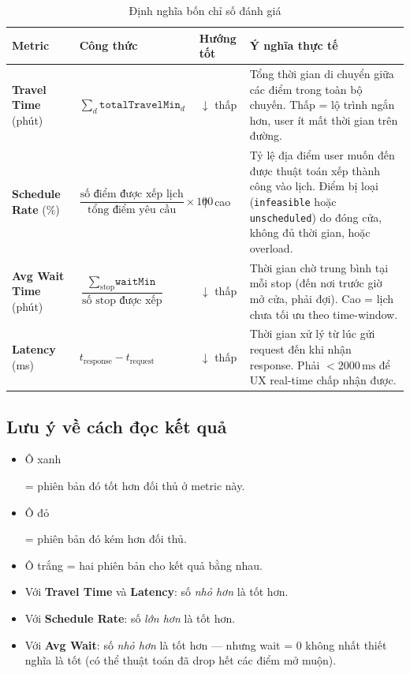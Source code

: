 \documentclass[12pt,a4paper]{article}
\begin{document}
\begin{table}[H]
\centering
\begin{tabular}{lp{4.5cm}lp{5.5cm}}
\toprule
\textbf{Metric} & \textbf{Công thức} & \textbf{Hướng tốt} & \textbf{Ý nghĩa thực tế} \\
\midrule
\textbf{Travel Time} (phút)
  & $\sum_{d} \texttt{totalTravelMin}_d$
  & $\downarrow$ thấp
  & Tổng thời gian di chuyển giữa các điểm trong toàn bộ chuyến. Thấp = lộ trình ngắn hơn, user ít mất thời gian trên đường. \\[6pt]
\textbf{Schedule Rate} (\%)
  & $\dfrac{\text{số điểm được xếp lịch}}{\text{tổng điểm yêu cầu}} \times 100$
  & $\uparrow$ cao
  & Tỷ lệ địa điểm user muốn đến được thuật toán xếp thành công vào lịch. Điểm bị loại (\texttt{infeasible} hoặc \texttt{unscheduled}) do đóng cửa, không đủ thời gian, hoặc overload. \\[6pt]
\textbf{Avg Wait Time} (phút)
  & $\dfrac{\sum_{\text{stop}} \texttt{waitMin}}{\text{số stop được xếp}}$
  & $\downarrow$ thấp
  & Thời gian chờ trung bình tại mỗi stop (đến nơi trước giờ mở cửa, phải đợi). Cao = lịch chưa tối ưu theo time-window. \\[6pt]
\textbf{Latency} (ms)
  & $t_{\text{response}} - t_{\text{request}}$
  & $\downarrow$ thấp
  & Thời gian xử lý từ lúc gửi request đến khi nhận response. Phải $< 2000\,\text{ms}$ để UX real-time chấp nhận được. \\
\bottomrule
\end{tabular}
\caption{Định nghĩa bốn chỉ số đánh giá}
\label{tab:metrics-def}
\end{table}

\subsection{Lưu ý về cách đọc kết quả}

\begin{tcolorbox}[scenbox, title={Cách đọc bảng kết quả}]
\begin{itemize}[leftmargin=*, itemsep=2pt]
  \item \colorbox{better}{\strut Ô xanh} = phiên bản đó tốt hơn đối thủ ở metric này.
  \item \colorbox{worse}{\strut Ô đỏ} = phiên bản đó kém hơn đối thủ.
  \item Ô trắng = hai phiên bản cho kết quả bằng nhau.
  \item Với \textbf{Travel Time} và \textbf{Latency}: số \textit{nhỏ hơn} là tốt hơn.
  \item Với \textbf{Schedule Rate}: số \textit{lớn hơn} là tốt hơn.
  \item Với \textbf{Avg Wait}: số \textit{nhỏ hơn} là tốt hơn --- nhưng wait = 0 không nhất thiết nghĩa là tốt (có thể thuật toán đã drop hết các điểm mở muộn).
\end{itemize}
\end{tcolorbox}
\end{document}
